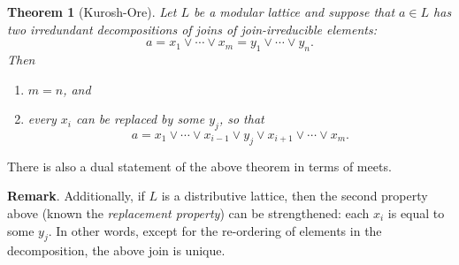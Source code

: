 \documentclass[12pt]{article}
\newtheorem{thm}{Theorem}
\begin{document}
\begin{thm}[Kurosh-Ore]  Let $L$ be a modular lattice and suppose that $a\in L$ has two irredundant decompositions of joins of join-irreducible elements:
$$a=x_1\vee \cdots \vee x_m = y_1 \vee \cdots \vee y_n.$$
Then
\begin{enumerate}
\item $m=n$, and
\item every $x_i$ can be replaced by some $y_j$, so that $$a= x_1\vee \cdots \vee x_{i-1} \vee y_j \vee x_{i+1} \vee \cdots \vee x_m.$$
\end{enumerate}
\end{thm}

There is also a dual statement of the above theorem in terms of meets.

\textbf{Remark}.  Additionally, if $L$ is a distributive lattice, then the second property above (known the \emph{replacement property}) can be strengthened: each $x_i$ is equal to some $y_j$.  In other words, except for the re-ordering of elements in the decomposition, the above join is unique.
\end{document}
